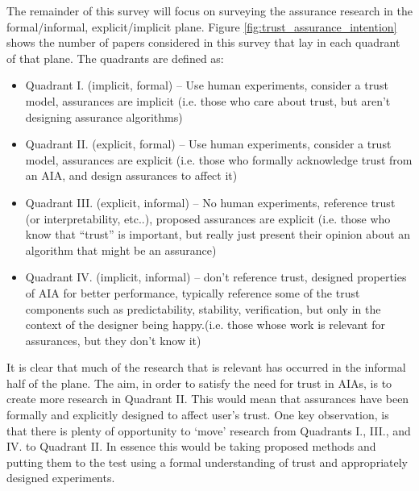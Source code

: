 The remainder of this survey will focus on surveying the assurance research in the formal/informal, explicit/implicit plane. Figure \ref{fig:trust_assurance_intention} shows the number of papers considered in this survey that lay in each quadrant of that plane. The quadrants are defined as:

\begin{itemize}
    \item Quadrant I. (implicit, formal) -- Use human experiments, consider a trust model, assurances are implicit (i.e. those who care about trust, but aren't designing assurance algorithms)
    \item Quadrant II. (explicit, formal) -- Use human experiments, consider a trust model, assurances are explicit (i.e. those who formally acknowledge trust from an AIA, and design assurances to affect it)
    \item Quadrant III. (explicit, informal) -- No human experiments, reference trust (or interpretability, etc..), proposed assurances are explicit (i.e. those who know that ``trust'' is important, but really just present their opinion about an algorithm that might be an assurance)
    \item Quadrant IV. (implicit, informal) -- don't reference trust, designed properties of AIA for better performance, typically reference some of the trust components such as predictability, stability, verification, but only in the context of the designer being happy.(i.e. those whose work is relevant for assurances, but they don't know it)
\end{itemize}

It is clear that much of the research that is relevant has occurred in the informal half of the plane. The aim, in order to satisfy the need for trust in AIAs, is to create more research in Quadrant II. This would mean that assurances have been formally and explicitly designed to affect user's trust. One key observation, is that there is plenty of opportunity to `move' research from Quadrants I., III., and IV. to Quadrant II. In essence this would be taking proposed methods and putting them to the test using a formal understanding of trust and appropriately designed experiments.





